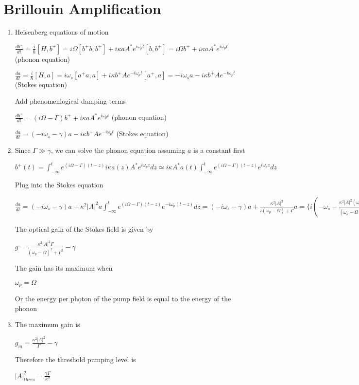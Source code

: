 \documentclass{article}
\begin{document}
    \section{ Brillouin Amplification}\label{brillouin-amplification}
\begin{enumerate}
\def\labelenumi{\arabic{enumi}.}
  \item Heisenberg equations of motion

$\frac{d b^+}{dt} = \frac{i}{\hbar} [H, b^+] = i \Omega [b^+b, b^+] + i \kappa a A^* e^{i \omega_p t}[b , b^+] = i \Omega b^+ + i \kappa a A^* e^{i \omega_p t}$
(phonon equation)

$\frac{d a}{dt} = \frac{i}{\hbar} [H, a] = i \omega_{s} [a^+a, a] + i \kappa b^+ A e^{-i \omega_p t}[a^+ , a] = -i \omega_{s} a - i \kappa b^+ A e^{-i \omega_p t}$
(Stokes equation)

Add phenomenlogical damping terms

$\frac{d b^+}{dt} =  (i\Omega - \Gamma)b^+ + i \kappa a A^* e^{i \omega_p t}$
(phonon equation)

$\frac{d a}{dt} = (-i\omega_{s} - \gamma) a - i \kappa b^+ A e^{-i \omega_p t}$
(Stokes equation)



 \item Since $\Gamma \gg \gamma$, we can solve the phonon equation assuming
$a$ is a constant first

$b^+ (t) = \int_{-\infty}^t e^{(i\Omega - \Gamma)(t-z)}i \kappa a(z) A^* e^{i \omega_p z} dz \simeq i \kappa  A^* a(t) \int_{-\infty}^t e^{(i\Omega - \Gamma)(t-z)} e^{i \omega_p z} dz$

Plug into the Stokes equation

$\frac{d a}{dt} = (-i\omega_{s} - \gamma) a + \kappa^2  |A|^2 a\int_{-\infty}^t e^{(i\Omega - \Gamma)(t-z)} e^{-i \omega_p (t-z)} dz = (-i \omega_{s} - \gamma) a +  \frac{\kappa^2  |A|^2 }{i(\omega_p-\Omega)+\Gamma} a = \{i (-\omega_{s} - \frac{\kappa^2  |A|^2(\omega_p-\Omega) }{(\omega_p-\Omega)^2+\Gamma^2}) +  (\frac{\kappa^2  |A|^2 \Gamma}{(\omega_p-\Omega)^2+\Gamma^2}-\gamma )\}a$

The optical gain of the Stokes field is given by

$g = \frac{\kappa^2  |A|^2 \Gamma}{(\omega_p-\Omega)^2+\Gamma^2}-\gamma$

The gain has its maximum when

$\omega_p  = \Omega$

Or the energy per photon of the pump field is equal to the energy of the
phonon

  \item The maximum gain is

$g_m = \frac{\kappa^2  |A|^2 }{\Gamma}-\gamma$

Therefore the threshold pumping level is

$|A|^2_{thres}= \frac{\gamma \Gamma}{\kappa^2}$

\end{enumerate}
\end{document}
